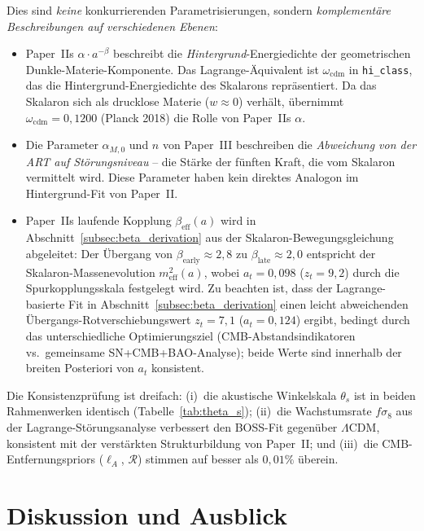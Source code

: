 \documentclass[11pt,a4paper]{article}
\begin{document}
Dies sind \textit{keine} konkurrierenden Parametrisierungen, sondern \textit{komplement\"are Beschreibungen auf verschiedenen Ebenen}:
\begin{itemize}
\item Paper~IIs $\alpha \cdot a^{-\beta}$ beschreibt die \textit{Hintergrund}-Energiedichte der geometrischen Dunkle-Materie-Komponente. Das Lagrange-\"Aquivalent ist $\omega_{\mathrm{cdm}}$ in \texttt{hi\_class}, das die Hintergrund-Energiedichte des Skalarons repr\"asentiert. Da das Skalaron sich als drucklose Materie ($w \approx 0$) verh\"alt, \"ubernimmt $\omega_{\mathrm{cdm}} = 0{,}1200$ (Planck 2018) die Rolle von Paper~IIs $\alpha$.
\item Die Parameter $\alpha_{M,0}$ und $n$ von Paper~III beschreiben die \textit{Abweichung von der ART auf St\"orungsniveau} -- die St\"arke der f\"unften Kraft, die vom Skalaron vermittelt wird. Diese Parameter haben kein direktes Analogon im Hintergrund-Fit von Paper~II.
\item Paper~IIs laufende Kopplung $\beta_{\mathrm{eff}}(a)$ wird in Abschnitt~\ref{subsec:beta_derivation} aus der Skalaron-Bewegungsgleichung abgeleitet: Der \"Ubergang von $\beta_{\mathrm{early}} \approx 2{,}8$ zu $\beta_{\mathrm{late}} \approx 2{,}0$ entspricht der Skalaron-Massenevolution $m_{\mathrm{eff}}^2(a)$, wobei $a_t = 0{,}098$ ($z_t = 9{,}2$) durch die Spurkopplungsskala festgelegt wird. Zu beachten ist, dass der Lagrange-basierte Fit in Abschnitt~\ref{subsec:beta_derivation} einen leicht abweichenden \"Ubergangs-Rotverschiebungswert $z_t = 7{,}1$ ($a_t = 0{,}124$) ergibt, bedingt durch das unterschiedliche Optimierungsziel (CMB-Abstandsindikatoren vs.\ gemeinsame SN+CMB+BAO-Analyse); beide Werte sind innerhalb der breiten Posteriori von $a_t$ konsistent.
\end{itemize}

Die Konsistenzpr\"ufung ist dreifach: (i)~die akustische Winkelskala $\theta_s$ ist in beiden Rahmenwerken identisch (Tabelle~\ref{tab:theta_s}); (ii)~die Wachstumsrate $f\sigma_8$ aus der Lagrange-St\"orungsanalyse verbessert den BOSS-Fit gegen\"uber $\Lambda$CDM, konsistent mit der verst\"arkten Strukturbildung von Paper~II; und (iii)~die CMB-Entfernungspriors ($\ell_A$, $\mathcal{R}$) stimmen auf besser als $0{,}01\%$ \"uberein.


\section{Diskussion und Ausblick}
\label{sec:discussion}
\end{document}
